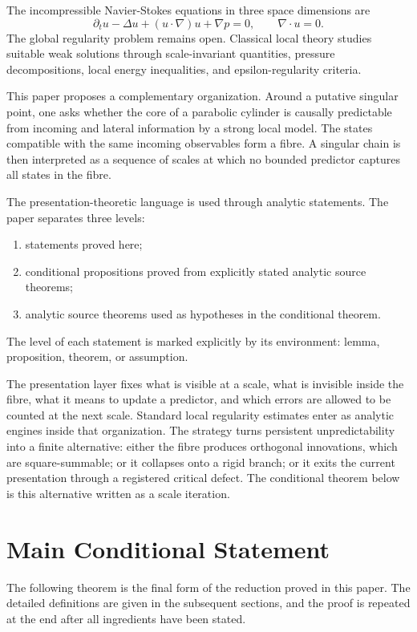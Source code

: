 \documentclass[11pt]{article}
\begin{document}
The incompressible Navier-Stokes equations in three space dimensions are
\[
\partial_t u-\Delta u+(u\cdot\nabla)u+\nabla p=0,
\qquad
\nabla\cdot u=0.
\]
The global regularity problem remains open. Classical local theory studies suitable weak solutions through scale-invariant quantities, pressure decompositions, local energy inequalities, and epsilon-regularity criteria.

This paper proposes a complementary organization. Around a putative singular
point, one asks whether the core of a parabolic cylinder is causally predictable
from incoming and lateral information by a strong local model. The states
compatible with the same incoming observables form a fibre. A singular chain is
then interpreted as a sequence of scales at which no bounded predictor captures
all states in the fibre.

The presentation-theoretic language is used through analytic statements. The paper separates three levels:
\begin{enumerate}[label=(\roman*)]
\item statements proved here;
\item conditional propositions proved from explicitly stated analytic source theorems;
\item analytic source theorems used as hypotheses in the conditional theorem.
\end{enumerate}
The level of each statement is marked explicitly by its environment: lemma, proposition, theorem, or assumption.

The presentation layer fixes what is visible at a scale, what is invisible
inside the fibre, what it means to update a predictor, and which errors are
allowed to be counted at the next scale.  Standard local regularity estimates
enter as analytic engines inside that organization.  The strategy turns
persistent unpredictability into a finite alternative: either the fibre produces
orthogonal innovations, which are square-summable; or it collapses onto a rigid
branch; or it exits the current presentation through a registered critical
defect.  The conditional theorem below is this alternative written as a scale
iteration.

\section{Main Conditional Statement}

The following theorem is the final form of the reduction proved in this paper.
The detailed definitions are given in the subsequent sections, and the proof is
repeated at the end after all ingredients have been stated.
\end{document}
